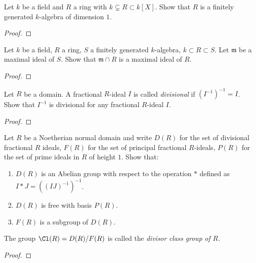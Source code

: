 \begin{problem}
Let $k$ be a field and $R$ a ring with $k\subsetneq R\subset k[X]$. Show
that $R$ is a finitely generated $k$-algebra of dimension $1$.
\end{problem}
\begin{proof}
\end{proof}
\newpage
\begin{problem}
Let $k$ be a field, $R$ a ring, $S$ a finitely generated $k$-algebra,
$k\subset R\subset S$. Let $\mathfrak{m}$ be a maximal ideal of $S$. Show
that $\mathfrak{m}\cap R$ is a maximal ideal of $R$.
\end{problem}
\begin{proof}
\end{proof}
\newpage
\begin{problem}
Let $R$ be a domain. A fractional $R$-ideal $I$ is called \emph{divisional}
if $(I^{-1})^{-1}=I$. Show that $I^{-1}$ is divisional for any fractional
$R$-ideal $I$.
\end{problem}
\begin{proof}
\end{proof}
\newpage
\begin{problem}
Let $R$ be a Noetherian normal domain and write $D(R)$ for the set of
divisional fractional $R$ ideals, $F(R)$ for the set of principal
fractional $R$-ideals, $P(R)$ for the set of prime ideals in $R$ of height
$1$. Show that:
\begin{enumerate}[label=(\alph*)]
\item $D(R)$ is an Abelian group with respect to the operation $*$ defined
  as $I*J=((IJ)^{-1})^{-1}$.
\item $D(R)$ is free with basis $P(R)$.
\item $F(R)$ is a subgroup of $D(R)$.
\end{enumerate}
The group $\Cl(R)=D(R)/F(R)$ is called the \emph{divisor class group of
  $R$.}
\end{problem}
\begin{proof}
\end{proof}

